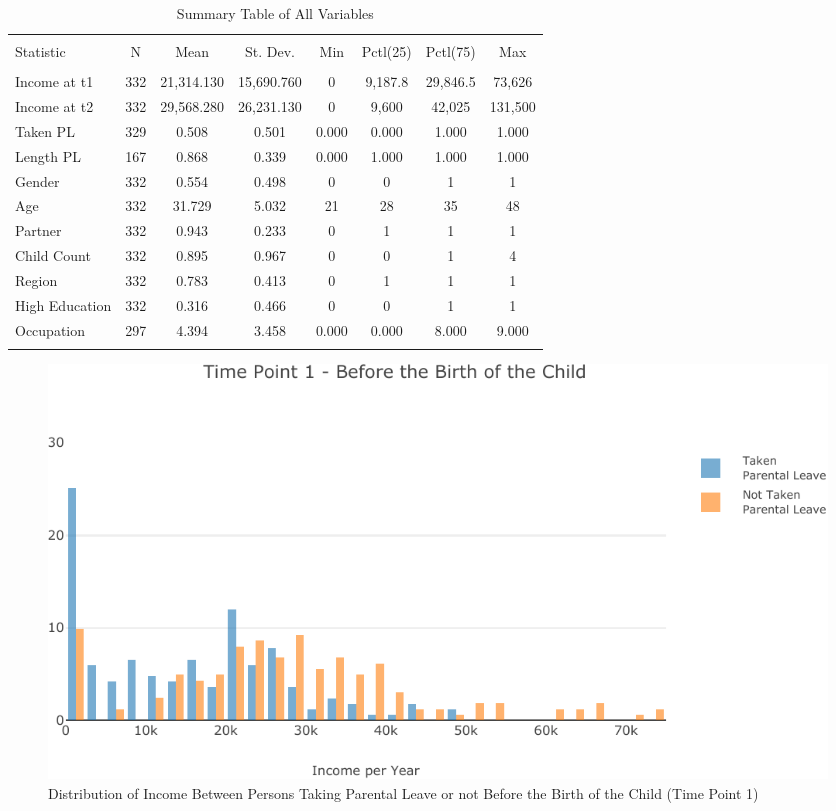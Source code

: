 \documentclass[
  11pt,
]{article}
\begin{document}
\begin{table}[!htbp] \centering 
  \caption{Summary Table of All Variables} 
  \label{tab1} 
\begin{tabular}{@{\extracolsep{5pt}}lccccccc} 
\\[-1.8ex]\hline 
\hline \\[-1.8ex] 
Statistic & \multicolumn{1}{c}{N} & \multicolumn{1}{c}{Mean} & \multicolumn{1}{c}{St. Dev.} & \multicolumn{1}{c}{Min} & \multicolumn{1}{c}{Pctl(25)} & \multicolumn{1}{c}{Pctl(75)} & \multicolumn{1}{c}{Max} \\ 
\hline \\[-1.8ex] 
Income at t1 & 332 & 21,314.130 & 15,690.760 & 0 & 9,187.8 & 29,846.5 & 73,626 \\ 
Income at t2 & 332 & 29,568.280 & 26,231.130 & 0 & 9,600 & 42,025 & 131,500 \\ 
Taken PL  & 329 & 0.508 & 0.501 & 0.000 & 0.000 & 1.000 & 1.000 \\ 
Length PL & 167 & 0.868 & 0.339 & 0.000 & 1.000 & 1.000 & 1.000 \\ 
Gender & 332 & 0.554 & 0.498 & 0 & 0 & 1 & 1 \\ 
Age & 332 & 31.729 & 5.032 & 21 & 28 & 35 & 48 \\ 
Partner & 332 & 0.943 & 0.233 & 0 & 1 & 1 & 1 \\ 
Child Count & 332 & 0.895 & 0.967 & 0 & 0 & 1 & 4 \\ 
Region & 332 & 0.783 & 0.413 & 0 & 1 & 1 & 1 \\ 
High Education & 332 & 0.316 & 0.466 & 0 & 0 & 1 & 1 \\ 
Occupation & 297 & 4.394 & 3.458 & 0.000 & 0.000 & 8.000 & 9.000 \\ 
\hline \\[-1.8ex] 
\end{tabular} 
\end{table}

\begin{figure}

{\centering \includegraphics{Parental_Leave-GESS-VersionRmd_files/figure-latex/fig-1-1} 

}

\caption{Distribution of Income Between Persons Taking Parental Leave or not Before the Birth of the Child (Time Point 1)}\label{fig:fig-1}
\end{figure}
\end{document}
